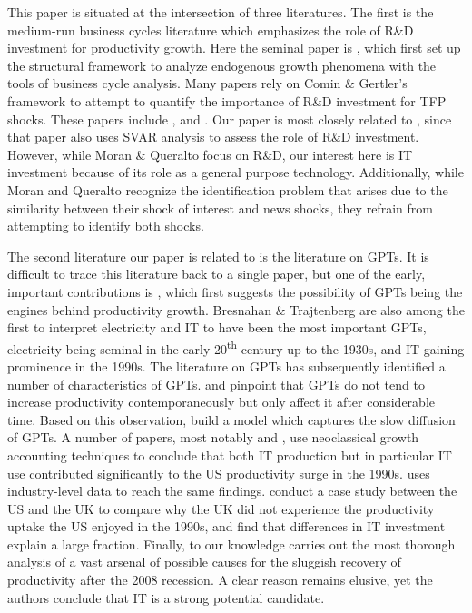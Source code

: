 \documentclass[11pt]{article}
\renewcommand{\[}{\begin{equation}}
\renewcommand{\]}{\end{equation}}
\begin{document}
This paper is situated at the intersection of three literatures. The first is the medium-run business cycles literature which emphasizes the role of R\&D investment for productivity growth. Here the seminal paper is \cite{comin_gertler2006}, which first set up the structural framework to analyze endogenous growth phenomena with the tools of business cycle analysis. Many papers rely on Comin \& Gertler's framework to attempt to quantify the importance of R\&D investment for TFP shocks. These papers include \cite{anzo_etal2016}, \cite{comin_etal2016} and \cite{moran_queralto2017}. Our paper is most closely related to \cite{moran_queralto2017}, since that paper also uses SVAR analysis to assess the role of R\&D investment. However, while Moran \& Queralto focus on R\&D, our interest here is IT investment because of its role as a general purpose technology. Additionally, while Moran and Queralto recognize the identification problem that arises due to the similarity between their shock of interest and news shocks, they refrain from attempting to identify both shocks. 

The second literature our paper is related to is the literature on GPTs. It is difficult to trace this literature back to a single paper, but one of the early, important contributions is \cite{bresnahan_trajtenberg1992}, which first suggests the possibility of GPTs being the engines behind productivity growth. Bresnahan \& Trajtenberg are also among the first to interpret electricity and IT to have been the most important GPTs, electricity being seminal in the early 20\textsuperscript{th} century up to the 1930s, and IT gaining prominence in the 1990s. The literature on GPTs has subsequently identified a number of characteristics of GPTs. \cite{david1990} and \cite{jov_rous2005} pinpoint that GPTs do not tend to increase productivity contemporaneously but only affect it after considerable time. Based on this observation, \cite{atkeson_kehoe2007} build a model which captures the slow diffusion of GPTs. A number of papers, most notably \cite{oliner_sichel2000} and \cite{oulton2010}, use neoclassical growth accounting techniques to conclude that both IT production but in particular IT use contributed significantly to the US productivity surge in the 1990s. \cite{stiroh2002} uses industry-level data to reach the same findings. \cite{basu_etal2004} conduct a case study between the US and the UK to compare why the UK did not experience the productivity uptake the US enjoyed in the 1990s, and find that differences in IT investment explain a large fraction. Finally, to our knowledge \cite{allstar_paper} carries out the most thorough analysis of a vast arsenal of possible causes for the sluggish recovery of productivity after the 2008 recession. A clear reason remains elusive, yet the authors conclude that IT is a strong potential candidate. 
\end{document}
